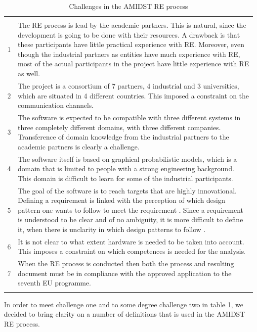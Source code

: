 \documentclass[11pt, oneside]{article}   	%
\begin{document}
\begin{table}
\caption{Challenges in the AMIDST RE process}
\vspace{1ex}
\begin{tabular}{
>{\raggedright\hspace{0pt}}m{8mm}%
>{\raggedright\hspace{0pt}}p{120mm}}
\hline
& \tabularnewline
1 & The RE process is lead by the academic partners.  This is natural, since the development is going to be done with their resources.  A drawback is that these participants have little practical experience with RE.  Moreover, even though the industrial partners as entities have much experience with RE, most of the actual participants in the project have little experience with RE as well.   \tabularnewline
2 & The project is a consortium of 7 partners, 4 industrial and 3 universities, which are situated in 4 different countries.  This imposed a constraint on the communication channels. \tabularnewline
3 & The software is expected to be compatible with three different systems in three completely different domains, with three different companies. Transference of domain knowledge from the industrial partners to the academic partners is clearly a challenge. \tabularnewline
4 & The software itself is based on graphical probabilistic models, which is a domain that is limited to people with a strong engineering background.  This domain is difficult to learn for some of the industrial participants.  \tabularnewline
5 & The goal of the software is to reach targets that are highly innovational. Defining a requirement is linked with the perception of which design pattern one wants to follow to meet the requirement \cite{Ral13}.  Since a requirement is understood to be clear and of no ambiguity, it is more difficult to define it, when there is unclarity in which design patterns to follow \cite{Ral13}. \tabularnewline
6 & It is not clear to what extent hardware is needed to be taken into account.  This imposes a constraint on which competences is needed for the analysis. \tabularnewline
7 & When the RE process is conducted then both the process and resulting document must be in compliance with the approved application to the seventh EU programme. \tabularnewline
& \tabularnewline
\hline
\end{tabular}
\label{tab:challenges}
\end{table}

In order to meet challenge one and to some degree challenge two in table \ref{tab:challenges}, we decided to bring clarity on a number of definitions that is used in the AMIDST RE process.
\end{document}
